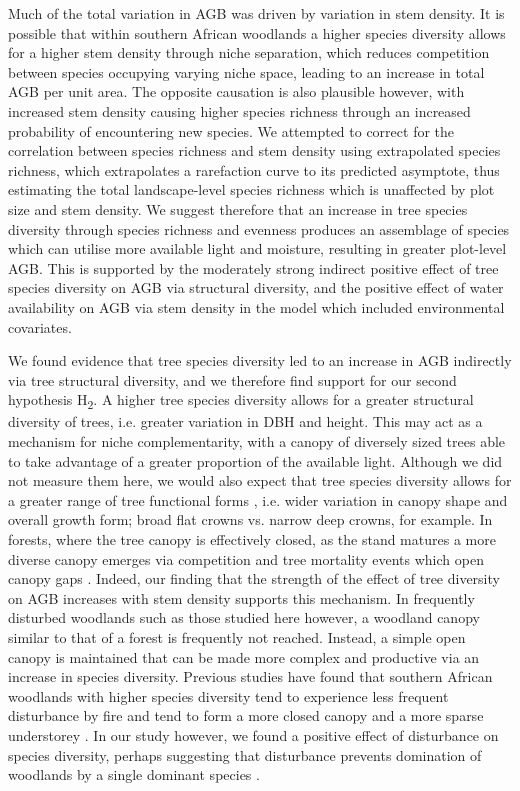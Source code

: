 \documentclass[11pt,a4paper]{article}
\begin{document}
Much of the total variation in AGB was driven by variation in stem density. It is possible that within southern African woodlands a higher species diversity allows for a higher stem density through niche separation, which reduces competition between species occupying varying niche space, leading to an increase in total AGB per unit area. The opposite causation is also plausible however, with increased stem density causing higher species richness through an increased probability of encountering new species. We attempted to correct for the correlation between species richness and stem density using extrapolated species richness, which extrapolates a rarefaction curve to its predicted asymptote, thus estimating the total landscape-level species richness which is unaffected by plot size and stem density. We suggest therefore that an increase in tree species diversity through species richness and evenness produces an assemblage of species which can utilise more available light and moisture, resulting in greater plot-level AGB. This is supported by the moderately strong indirect positive effect of tree species diversity on AGB via structural diversity, and the positive effect of water availability on AGB via stem density in the model which included environmental covariates. 

We found evidence that tree species diversity led to an increase in AGB indirectly via tree structural diversity, and we therefore find support for our second hypothesis H\textsubscript{2}. A higher tree species diversity allows for a greater structural diversity of trees, i.e. greater variation in DBH and height. This may act as a mechanism for niche complementarity, with a canopy of diversely sized trees able to take advantage of a greater proportion of the available light. Although we did not measure them here, we would also expect that tree species diversity allows for a greater range of tree functional forms \citep{Pretzsch2014}, i.e. wider variation in canopy shape and overall growth form; broad flat crowns vs. narrow deep crowns, for example. In forests, where the tree canopy is effectively closed, as the stand matures a more diverse canopy emerges via competition and tree mortality events which open canopy gaps \citep{Muscolo2014}. Indeed, our finding that the strength of the effect of tree diversity on AGB increases with stem density supports this mechanism. In frequently disturbed woodlands such as those studied here however, a woodland canopy similar to that of a forest is frequently not reached. Instead, a simple open canopy is maintained that can be made more complex and productive via an increase in species diversity. Previous studies have found that southern African woodlands with higher species diversity tend to experience less frequent disturbance by fire and tend to form a more closed canopy and a more sparse understorey \citep{Chidumayo2013, Mutowo2012}. In our study however, we found a positive effect of disturbance on species diversity, perhaps suggesting that disturbance prevents domination of woodlands by a single dominant species \citep{Chidumayo2013}.
\end{document}
